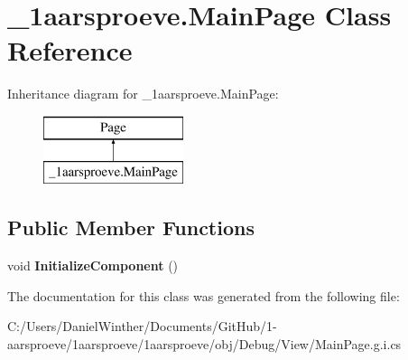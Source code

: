 \hypertarget{class__1aarsproeve_1_1_main_page}{}\section{\+\_\+1aarsproeve.\+Main\+Page Class Reference}
\label{class__1aarsproeve_1_1_main_page}
Inheritance diagram for \+\_\+1aarsproeve.\+Main\+Page\+:\begin{figure}[H]
\begin{center}
\leavevmode
\includegraphics[height=2.000000cm]{class__1aarsproeve_1_1_main_page}
\end{center}
\end{figure}
\subsection*{Public Member Functions}
\begin{DoxyCompactItemize}
\item 
\hypertarget{class__1aarsproeve_1_1_main_page_a894e5b8cbf318b168cecd11961976ccf}{}void {\bfseries Initialize\+Component} ()\label{class__1aarsproeve_1_1_main_page_a894e5b8cbf318b168cecd11961976ccf}

\end{DoxyCompactItemize}


The documentation for this class was generated from the following file\+:\begin{DoxyCompactItemize}
\item 
C\+:/\+Users/\+Daniel\+Winther/\+Documents/\+Git\+Hub/1-\/aarsproeve/1aarsproeve/1aarsproeve/obj/\+Debug/\+View/Main\+Page.\+g.\+i.\+cs\end{DoxyCompactItemize}

